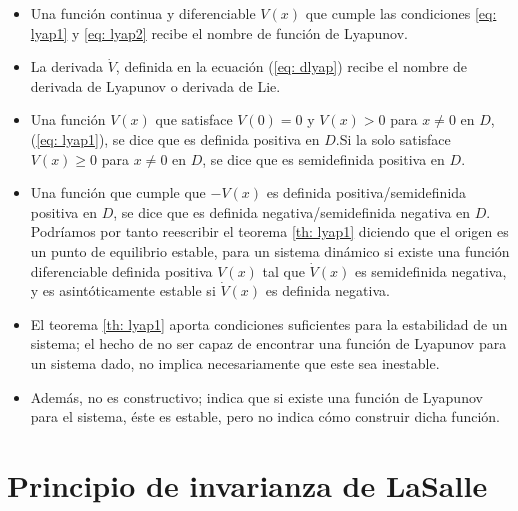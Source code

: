 \begin{itemize}
\item Una función continua y diferenciable $V(x)$ que cumple las condiciones \ref{eq: lyap1} y \ref{eq: lyap2} recibe el nombre de función de Lyapunov.
\item La derivada $\dot V$, definida en la ecuación (\ref{eq: dlyap}) recibe el nombre de derivada de Lyapunov o derivada de Lie.
\item Una función $V(x)$ que satisface $V(0)=0$ y $V(x)>0$ para $x\neq 0$ en $D$, (\ref{eq: lyap1}), se dice que es definida positiva en $D$.Si la solo satisface $V(x)\geq 0$ para $x\neq 0$ en $D$, se dice que es semidefinida positiva en $D$.
\item Una función que cumple que $-V(x)$ es definida positiva/semidefinida positiva en $D$, se dice que es definida negativa/semidefinida negativa en $D$. Podríamos por tanto reescribir el teorema \ref{th: lyap1} diciendo que el origen es un punto de equilibrio estable, para un sistema dinámico si existe una función diferenciable definida positiva $V(x)$ tal que $\dot V(x)$ es semidefinida negativa, y es asintóticamente estable si $\dot V(x)$ es definida negativa.
\item El teorema \ref{th: lyap1} aporta condiciones suficientes para la estabilidad de un sistema; el hecho de no ser capaz de encontrar una función de Lyapunov para un sistema dado, no implica necesariamente que este sea inestable. 
\item Además, no es constructivo; indica que si existe una función de Lyapunov para el sistema, éste es estable, pero no indica cómo construir dicha función. 
\end{itemize}







\section{Principio de invarianza de LaSalle}

